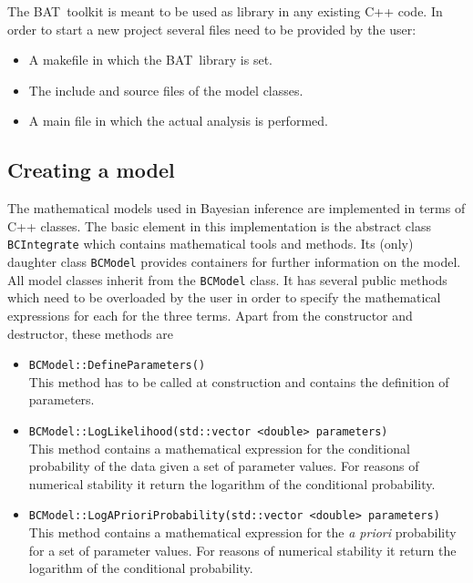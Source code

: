 \documentclass[11pt, a4paper]{article}
\newcommand{\BAT}{{\sc BAT}}
\begin{document}
The \BAT\ toolkit is meant to be used as library in any existing C++
code. In order to start a new project several files need to be
provided by the user:
% 
\begin{itemize}
\item A makefile in which the \BAT\ library is set. 
\item The include and source files of the model classes. 
\item A main file in which the actual analysis is performed. 
\end{itemize} 


\subsection{Creating a model} 

The mathematical models used in Bayesian inference are implemented in
terms of C++ classes. The basic element in this implementation is the
abstract class \verb|BCIntegrate| which contains mathematical tools
and methods. Its (only) daughter class \verb|BCModel| provides
containers for further information on the model. All model classes
inherit from the \verb|BCModel| class. It has several public methods
which need to be overloaded by the user in order to specify the
mathematical expressions for each for the three terms. Apart from the
constructor and destructor, these methods are
% 
\begin{itemize}
\item \verb|BCModel::DefineParameters()| \\
 This method has to be called at construction and contains the
 definition of parameters. 
% 
\item \verb|BCModel::LogLikelihood(std::vector <double> parameters)| \\ 
 This method contains a mathematical expression for the conditional
 probability of the data given a set of parameter values. For reasons
 of numerical stability it return the logarithm of the conditional
 probability.
%
\item \verb|BCModel::LogAPrioriProbability(std::vector <double> parameters)| \\
 This method contains a mathematical expression for the {\it a priori}
 probability for a set of parameter values. For reasons
 of numerical stability it return the logarithm of the conditional
 probability.
\end{itemize} 
\end{document}
